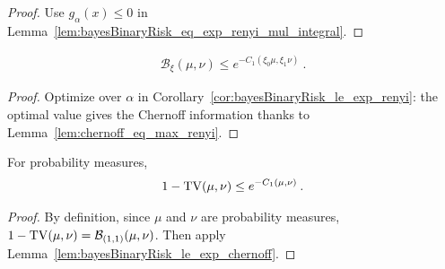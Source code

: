 \begin{proof}%
{}
Use $g_\alpha(x) \le 0$ in Lemma~\ref{lem:bayesBinaryRisk_eq_exp_renyi_mul_integral}.
\end{proof}


\begin{lemma}
  \label{lem:bayesBinaryRisk_le_exp_chernoff}
  \begin{align*}
  \mathcal B_\xi(\mu, \nu)
  \le e^{- C_1(\xi_0\mu, \xi_1\nu)}
  \: .
  \end{align*}
\end{lemma}

\begin{proof}%
{}
Optimize over $\alpha$ in Corollary~\ref{cor:bayesBinaryRisk_le_exp_renyi}: the optimal value gives the Chernoff information thanks to Lemma~\ref{lem:chernoff_eq_max_renyi}.
\end{proof}


\begin{lemma}
  \label{lem:one_sub_tv_le_exp_chernoff}
  For probability measures,
  \begin{align*}
  1 - \operatorname{TV}(\mu, \nu) \le e^{- C_1(\mu, \nu)} \: .
  \end{align*}
\end{lemma}

\begin{proof}%
{}
By definition, since $\mu$ and $\nu$ are probability measures, $1 - \operatorname{TV}(\mu, \nu) = \mathcal B_{(1,1)}(\mu, \nu)$. Then apply Lemma~\ref{lem:bayesBinaryRisk_le_exp_chernoff}.
\end{proof}